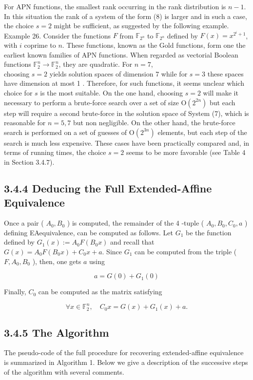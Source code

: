 \documentclass[10pt]{article}
\begin{document}
For APN functions, the smallest rank occurring in the rank distribution is $n-1$. In this situation the rank of a system of the form (8) is larger and in such a case, the choice $s=2$ might be sufficient, as suggested by the following example.\\
Example 26. Consider the functions $F$ from $\mathbb{F}_{2^{n}}$ to $\mathbb{F}_{2^{n}}$ defined by $F(x)=x^{2^{i}+1}$, with $i$ coprime to $n$. These functions, known as the Gold functions, form one the earliest known families of APN functions. When regarded as vectorial Boolean functions $\mathbb{F}_{2}^{n} \rightarrow \mathbb{F}_{2}^{n}$, they are quadratic. For $n=7$,\\
choosing $s=2$ yields solution spaces of dimension 7 while for $s=3$ these spaces have dimension at most 1 . Therefore, for such functions, it seems unclear which choice for $s$ is the most suitable. On the one hand, choosing $s=2$ will make it necessary to perform a brute-force search over a set of size $\mathrm{O}\left(2^{2 n}\right)$ but each step will require a second brute-force in the solution space of System (7), which is reasonable for $n=5,7$ but non negligible. On the other hand, the brute-force search is performed on a set of guesses of $\mathrm{O}\left(2^{3 n}\right)$ elements, but each step of the search is much less expensive. These cases have been practically compared and, in terms of running times, the choice $s=2$ seems to be more favorable (see Table 4 in Section 3.4.7).

\subsection*{3.4.4 Deducing the Full Extended-Affine Equivalence}
Once a pair ( $A_{0}, B_{0}$ ) is computed, the remainder of the 4 -tuple ( $A_{0}, B_{0}, C_{0}, a$ ) defining EAequivalence, can be computed as follows. Let $G_{1}$ be the function defined by $G_{1}(x):=A_{0} F\left(B_{0} x\right)$ and recall that $G(x)=A_{0} F\left(B_{0} x\right)+C_{0} x+a$. Since $G_{1}$ can be computed from the triple ( $F, A_{0}, B_{0}$ ), then, one gets $a$ using

$$
a=G(0)+G_{1}(0)
$$

Finally, $C_{0}$ can be computed as the matrix satisfying

$$
\forall x \in \mathbb{F}_{2}^{n}, \quad C_{0} x=G(x)+G_{1}(x)+a .
$$

\subsection*{3.4.5 The Algorithm}
The pseudo-code of the full procedure for recovering extended-affine equivalence is summarized in Algorithm 1. Below we give a description of the successive steps of the algorithm with several comments.
\end{document}
